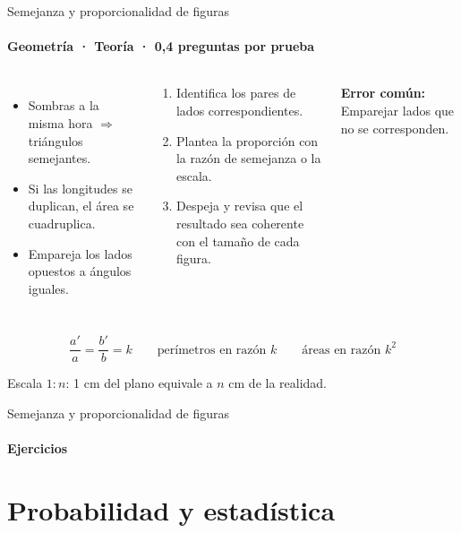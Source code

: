\documentclass[aspectratio=169,11pt]{beamer}
\newlength{\ajustealto}
\newenvironment{ajustar}[1][0.74\textheight]
  {\setlength{\ajustealto}{#1}\begin{lrbox}{\ajustecaja}\begin{minipage}{\textwidth}}
  {\end{minipage}\end{lrbox}%
   \ifdim\dimexpr\ht\ajustecaja+\dp\ajustecaja\relax>\ajustealto
     \resizebox*{!}{\ajustealto}{\usebox{\ajustecaja}}\else\usebox{\ajustecaja}\fi}
\begin{document}
\begin{frame}{Semejanza y proporcionalidad de figuras}
\label{tema-m1-triangulos}
\framesubtitle{Geometría · Teoría · 0,4 preguntas por prueba}
\begin{ajustar}
\begin{columns}[T,onlytextwidth]
\begin{itemize}\footnotesize
\item Sombras a la misma hora $\Rightarrow$ triángulos semejantes.
\item Si las longitudes se duplican, el área se cuadruplica.
\item Empareja los lados opuestos a ángulos iguales.
\end{itemize}
\begin{cajaregla}\scriptsize \begin{enumerate}\item Identifica los pares de lados correspondientes.\item Plantea la proporción con la razón de semejanza o la escala.\item Despeja y revisa que el resultado sea coherente con el tamaño de cada figura.\end{enumerate}\end{cajaregla}
\begin{notagris}\scriptsize \textbf{Error común:} Emparejar lados que no se corresponden.\end{notagris}
\end{columns}
\begin{cajaclave}\footnotesize
\[\frac{a'}{a}=\frac{b'}{b}=k \quad\quad \text{perímetros en razón } k \quad\quad \text{áreas en razón } k^2\]

Escala $1:n$: 1 cm del plano equivale a $n$ cm de la realidad.
\end{cajaclave}
\end{ajustar}
\end{frame}

\begin{frame}{Semejanza y proporcionalidad de figuras}
\framesubtitle{Ejercicios}
\vfill{}
\vfill
\end{frame}

\section{Probabilidad y estadística}
\end{document}
